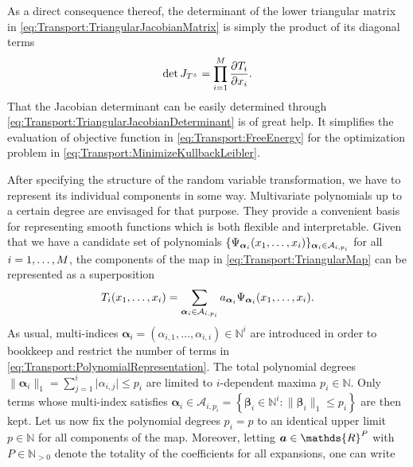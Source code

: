 As a direct consequence thereof, the determinant of the lower triangular matrix in \cref{eq:Transport:TriangularJacobianMatrix} is simply the product of its diagonal terms
\begin{equation} \label{eq:Transport:TriangularJacobianDeterminant}
  \det J_{T^\vartriangle} = \prod\limits_{i=1}^M \frac{\partial T_i}{\partial x_i}.
\end{equation}
That the Jacobian determinant can be easily determined through \cref{eq:Transport:TriangularJacobianDeterminant} is of great help.
It simplifies the evaluation of objective function in \cref{eq:Transport:FreeEnergy} for the optimization problem in \cref{eq:Transport:MinimizeKullbackLeibler}.
\par %
After specifying the structure of the random variable transformation, we have to represent its individual components in some way.
Multivariate polynomials up to a certain degree are envisaged for that purpose.
They provide a convenient basis for representing smooth functions which is both flexible and interpretable.
Given that we have a candidate set of polynomials \(\{\Psi_{\bm{\alpha}_i}(x_1,\ldots,x_i)\}_{\bm{\alpha}_i \in \mathcal{A}_{i,p_i}}\) for all \(i=1,\ldots,M\),
the components of the map in \cref{eq:Transport:TriangularMap} can be represented as a superposition
\begin{equation} \label{eq:Transport:PolynomialRepresentation}
  T_i(x_1,\ldots,x_i) = \sum\limits_{\bm{\alpha}_i \in \mathcal{A}_{i,p_i}} a_{\bm{\alpha}_i} \Psi_{\bm{\alpha}_i}(x_1,\ldots,x_i).
\end{equation}
As usual, multi-indices \(\bm{\alpha}_i = (\alpha_{i,1},\ldots,\alpha_{i,i}) \in \mathds{N}^i\) are introduced
in order to bookkeep and restrict the number of terms in \cref{eq:Transport:PolynomialRepresentation}.
The total polynomial degrees \(\lVert \bm{\alpha}_i \rVert_1 = \sum_{j=1}^i \lvert \alpha_{i,j} \rvert \leq p_i\) are limited to \(i\)-dependent maxima \(p_i \in \mathds{N}\).
Only terms whose multi-index satisfies \(\bm{\alpha}_i \in \mathcal{A}_{i,p_i} = \left\{ \bm{\beta}_i \in \mathds{N}^i \colon \lVert \bm{\beta}_i \rVert_1 \leq p_i \right\}\) are then kept.
Let us now fix the polynomial degrees \(p_i = p\) to an identical upper limit \(p \in \mathds{N}\) for all components of the map.
Moreover, letting \(\bm{\coeffM} \in \mathds{R}^P\) with \(P \in \mathds{N}_{>0}\) denote the totality of the coefficients for all expansions, one can write
